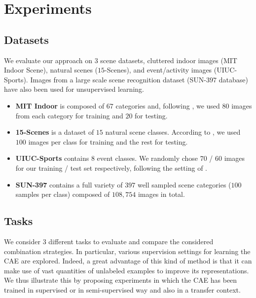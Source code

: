 \documentclass[runningheads,a4paper]{llncs}
\begin{document}
\section{Experiments} \label{sec:exp}


\subsection{Datasets}


We evaluate our approach on $3$ scene datasets, cluttered indoor images (MIT
Indoor Scene),  natural scenes ($15$-Scenes), and event/activity images
(UIUC-Sports). Images from a large scale scene recognition dataset (SUN-$397$
database) have also been used for unsupervised learning. 
\begin{itemize}
  \item {\bf{MIT Indoor}} is composed of $67$ categories and, following
\citep{LiJiaLi10,Quattoni09}, we used $80$ images from each category for
training and $20$ for testing.

\item {\bf{15-Scenes}} is a dataset of $15$ natural scene
classes. According to \citep{Lazebnik06}, we used $100$ images per class for
training and the rest for testing. 

\item {\bf{UIUC-Sports}} contains $8$ event classes.  We
randomly chose $70$ / $60$ images for our training / test set respectively,
following the setting of \citep{LiJiaLi10,LiJiaLi07}.

\item {\bf{SUN-397}} contains a full variety of $397$  well sampled
scene categories ($100$ samples per class) composed of $108,754$ images in total.
\end{itemize}





\subsection{Tasks}
\label{sec:results}

We consider $3$ different tasks to evaluate and compare the considered
combination strategies. In particular, various supervision settings
for learning the CAE are explored. Indeed, a great advantage of this
kind of method is that it can make use of vast quantities of unlabeled
examples to improve its representations. We thus illustrate this by
proposing experiments in which the CAE has been trained in supervised or
in semi-supervised way and also in a transfer context.
\end{document}
